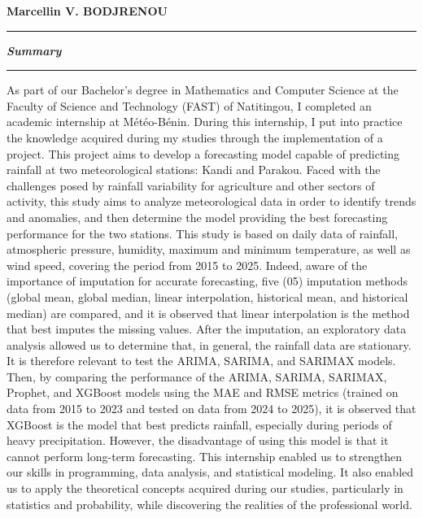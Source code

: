 \documentclass[a4paper,12pt]{report}
\theoremstyle{definition}
\begin{document}
	\vspace{0.5cm}
	\phantom{fjjffcmffffffffffffffffffffffjfffffffffffffffffffffffffjfjfjffjjjjjjjjjjjjjjhhhh} \textbf{Marcellin V. BODJRENOU}
	\newpage
	
	
	\begin{center}
		\colorbox{gray!0}{\rule{\textwidth}{0.005cm}}
		{\Huge\textbf{\textit{Summary}}}
		\vspace{1cm}
		\colorbox{gray!0}{\rule{\textwidth}{0.005cm}}
	\end{center}
	As part of our Bachelor's degree in Mathematics and Computer Science at the Faculty of Science and Technology (FAST) of Natitingou, I completed an academic internship at Météo-Bénin. During this internship, I put into practice the knowledge acquired during my studies through the implementation of a project. This project aims to develop a forecasting model capable of predicting rainfall at two meteorological stations: Kandi and Parakou. Faced with the challenges posed by rainfall variability for agriculture and other sectors of activity, this study aims to analyze meteorological data in order to identify trends and anomalies, and then determine the model providing the best forecasting performance for the two stations. This study is based on daily data of rainfall, atmospheric pressure, humidity, maximum and minimum temperature, as well as wind speed, covering the period from 2015 to 2025. Indeed, aware of the importance of imputation for accurate forecasting, five (05) imputation methods (global mean, global median, linear interpolation, historical mean, and historical median) are compared, and it is observed that linear interpolation is the method that best imputes the missing values. After the imputation, an exploratory data analysis allowed us to determine that, in general, the rainfall data are stationary. It is therefore relevant to test the ARIMA, SARIMA, and SARIMAX models. Then, by comparing the performance of the ARIMA, SARIMA, SARIMAX, Prophet, and XGBoost models using the MAE and RMSE metrics (trained on data from 2015 to 2023 and tested on data from 2024 to 2025), it is observed that XGBoost is the model that best predicts rainfall, especially during periods of heavy precipitation. However, the disadvantage of using this model is that it cannot perform long-term forecasting. This internship enabled us to strengthen our skills in programming, data analysis, and statistical modeling. It also enabled us to apply the theoretical concepts acquired during our studies, particularly in statistics and probability, while discovering the realities of the professional world.	\\
	
\end{document}

